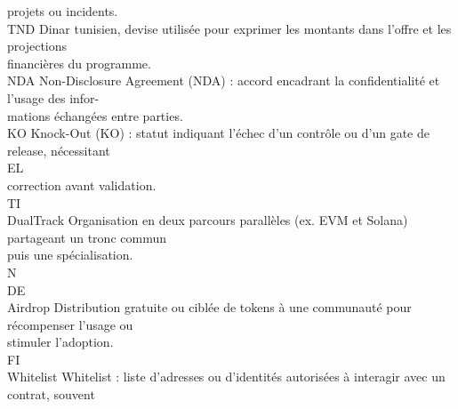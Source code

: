 projets ou incidents.\\
\vspace{0.5em}
TND                                     Dinar tunisien, devise utilisée pour exprimer les montants dans l’offre et les projections\\
financières du programme.\\
\vspace{0.5em}
NDA                                     Non-Disclosure Agreement (NDA) : accord encadrant la confidentialité et l’usage des infor-\\
mations échangées entre parties.\\
\vspace{0.5em}
KO                                      Knock-Out (KO) : statut indiquant l’échec d’un contrôle ou d’un gate de release, nécessitant\\
\vspace{0.5em}
\vspace{0.5em}
\vspace{0.5em}
\vspace{0.5em}
EL\\
correction avant validation.\\
\vspace{0.5em}
\vspace{0.5em}
\vspace{0.5em}
\vspace{0.5em}
TI\\
DualTrack                               Organisation en deux parcours parallèles (ex. EVM et Solana) partageant un tronc commun\\
puis une spécialisation.\\
\vspace{0.5em}
\vspace{0.5em}
\vspace{0.5em}
\vspace{0.5em}
N\\
DE\\
Airdrop                                 Distribution gratuite ou ciblée de tokens à une communauté pour récompenser l’usage ou\\
stimuler l’adoption.\\
\vspace{0.5em}
\vspace{0.5em}
\vspace{0.5em}
\vspace{0.5em}
FI\\
Whitelist                               Whitelist : liste d’adresses ou d’identités autorisées à interagir avec un contrat, souvent\\
